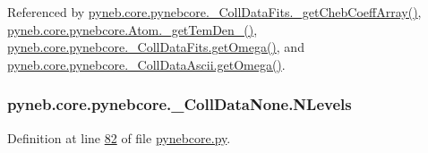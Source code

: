 Referenced by \hyperlink{pynebcore_8py_source_l00751}{pyneb.\-core.\-pynebcore.\-\_\-\-Coll\-Data\-Fits.\-\_\-get\-Cheb\-Coeff\-Array()}, \hyperlink{pynebcore_8py_source_l01869}{pyneb.\-core.\-pynebcore.\-Atom.\-\_\-get\-Tem\-Den\-\_()}, \hyperlink{pynebcore_8py_source_l00828}{pyneb.\-core.\-pynebcore.\-\_\-\-Coll\-Data\-Fits.\-get\-Omega()}, and \hyperlink{pynebcore_8py_source_l01082}{pyneb.\-core.\-pynebcore.\-\_\-\-Coll\-Data\-Ascii.\-get\-Omega()}.

\hypertarget{classpyneb_1_1core_1_1pynebcore_1_1___coll_data_none_a194d717f8c873199de6a3e0cb7d7a96b}{
\subsubsection[{N\-Levels}]{\setlength{\rightskip}{0pt plus 5cm}pyneb.\-core.\-pynebcore.\-\_\-\-Coll\-Data\-None.\-N\-Levels}}\label{classpyneb_1_1core_1_1pynebcore_1_1___coll_data_none_a194d717f8c873199de6a3e0cb7d7a96b}


Definition at line \hyperlink{pynebcore_8py_source_l00082}{82} of file \hyperlink{pynebcore_8py_source}{pynebcore.\-py}.



